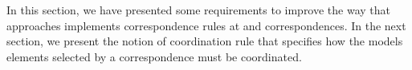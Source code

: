 


	

In this section, we have presented some requirements to improve the way that approaches implements correspondence rules at and correspondences. %
In the next section, we present the notion of coordination rule that specifies how the models elements selected by a correspondence must be coordinated.     
	
	
					


